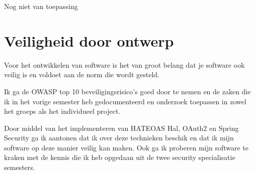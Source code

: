 Nog niet van toepassing








\newpage
\section{Veiligheid door ontwerp}\label{sec:veiligheid-door-ontwerp}

Voor het ontwikkelen van software is het van groot belang dat je software ook veilig is en voldoet aan de norm die
wordt gesteld.

Ik ga de OWASP top 10 beveiligingsrisico's goed door te nemen en de zaken die ik in het vorige semester heb
gedocumenteerd en onderzoek toepassen in zowel het groeps als het individueel project.

Door middel van het implementeren van HATEOAS Hal, OAuth2 en Spring Security ga ik aantonen dat ik over deze
technieken beschik en dat ik mijn software op deze manier veilig kan maken.
Ook ga ik proberen mijn software te kraken met de kennis die ik heb opgedaan uit de twee security specialisatie
semesters.











\newpage

